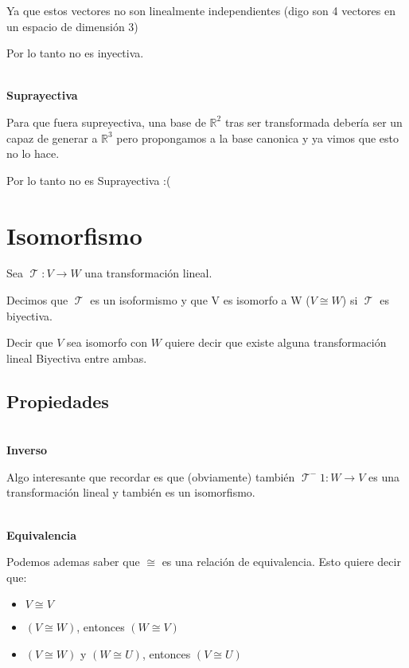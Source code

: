 \documentclass[12pt]{report}                                    %
\DeclareMathOperator \LinealTransformation {\mathcal{T}}
\begin{document}
            Ya que estos vectores no son linealmente independientes (digo son 4 vectores en un espacio de dimensión 3)

            Por lo tanto no es inyectiva.

            \textbf{\\Suprayectiva}

            Para que fuera supreyectiva, una base de $\mathbb{R}^2$ tras ser transformada debería ser un capaz de
            generar a $\mathbb{R}^3$ pero propongamos a la base canonica y ya vimos que esto no lo hace.

            Por lo tanto no es Suprayectiva :(


    \clearpage
    \section{Isomorfismo}
        Sea $\LinealTransformation : V \to W $ una transformación lineal.

        Decimos que $\LinealTransformation$ es un isoformismo y que V es isomorfo a W 
        ($V \cong W$) si $\LinealTransformation$ es biyectiva.

        Decir que $V$ sea isomorfo con $W$ quiere decir que existe alguna transformación
        lineal Biyectiva entre ambas.

        \subsection{Propiedades}

            \textbf{\\Inverso}

            Algo interesante que recordar es que (obviamente) también
            $\LinealTransformation^-1 : W \to V $ es una transformación lineal
            y también es un isomorfismo.

            \textbf{\\Equivalencia}

            Podemos ademas saber que $\cong$ es una relación de equivalencia.
            Esto quiere decir que:

            \begin{itemize}
                \item $V \cong V$
                \item $(V \cong W)$, entonces $(W \cong V)$
                \item $(V \cong W)$ y $(W \cong U)$, entonces $(V \cong U)$
            \end{itemize}
\end{document}
